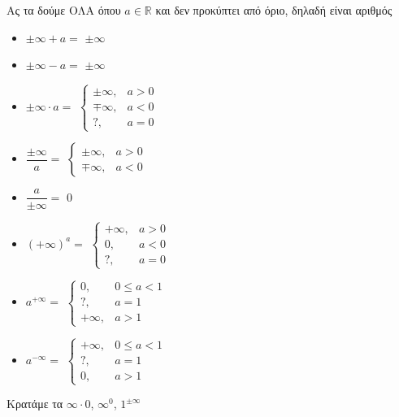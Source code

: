 \documentclass{presentation}
\begin{document}
\begin{frame}{Ας τα δούμε ΟΛΑ}
  όπου $a\in\mathbb{R}$ και δεν προκύπτει από όριο, δηλαδή είναι αριθμός
  \begin{multicols}{2}
    \begin{itemize}
      \item $\pm\infty + a=$ \pause $\pm\infty$ \pause
      \item $\pm\infty - a=$ \pause $\pm\infty$ \pause
      \item $\pm\infty \cdot a=$ \pause $\begin{cases} \pm\infty, & a>0 \\ \mp\infty, & a<0 \\ ?, & a=0\end{cases}$ \pause
      \item $\dfrac{\pm\infty}{a}=$ \pause $\begin{cases} \pm\infty, & a>0 \\ \mp\infty, & a<0\end{cases}$ \pause
      \item $\dfrac{a}{\pm\infty}=$ \pause $0$ \pause
      \item $(+\infty)^a=$ \pause $\begin{cases} +\infty, & a>0 \\ 0, & a<0 \\ ?, & a=0\end{cases}$ \pause
      \item $a^{+\infty}=$ \pause $\begin{cases} 0, & 0\le a <1 \\ ?, & a=1 \\ +\infty, & a>1\end{cases}$ \pause
      \item $a^{-\infty}=$ \pause $\begin{cases} +\infty, & 0\le a <1 \\ ?, & a=1 \\ 0, & a>1\end{cases}$ \pause
    \end{itemize}
  \end{multicols}
  Κρατάμε τα $\infty\cdot 0$, $\infty^0$, $1^{\pm\infty}$
\end{frame}
\end{document}
